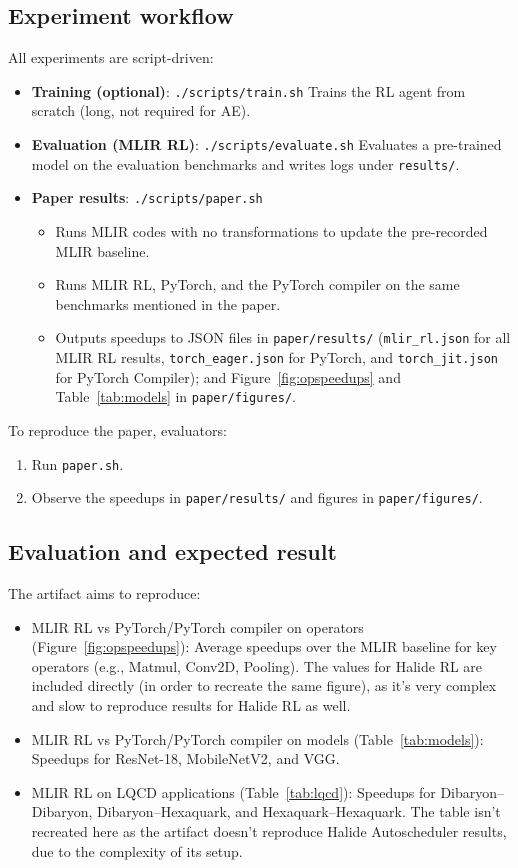 \documentclass[10pt,twocolumn]{article}
\begin{document}
\subsection{Experiment workflow}
All experiments are script-driven:
\begin{itemize}
\item \textbf{Training (optional)}: \texttt{./scripts/train.sh} Trains the RL agent from scratch (long, not required for AE).
\item \textbf{Evaluation (MLIR RL)}: \texttt{./scripts/evaluate.sh} Evaluates a pre-trained model on the evaluation benchmarks and writes logs under \texttt{results/}.
\item \textbf{Paper results}: \texttt{./scripts/paper.sh}
\begin{itemize}
\item Runs MLIR codes with no transformations to update the pre-recorded MLIR baseline.
\item Runs MLIR RL, PyTorch, and the PyTorch compiler on the same benchmarks mentioned in the paper.
\item Outputs speedups to JSON files in \texttt{paper/results/} (\texttt{mlir\_rl.json} for all MLIR RL results, \texttt{torch\_eager.json} for PyTorch, and \texttt{torch\_jit.json} for PyTorch Compiler); and Figure~\ref{fig:opspeedups} and Table~\ref{tab:models} in \texttt{paper/figures/}.
\end{itemize}
\end{itemize}

To reproduce the paper, evaluators:
\begin{enumerate}
\item Run \texttt{paper.sh}.
\item Observe the speedups in \texttt{paper/results/} and figures in \texttt{paper/figures/}.
\end{enumerate}

\subsection{Evaluation and expected result}
The artifact aims to reproduce:
\begin{itemize}
\item MLIR RL vs PyTorch/PyTorch compiler on operators (Figure~\ref{fig:opspeedups}): Average speedups over the MLIR baseline for key operators (e.g., Matmul, Conv2D, Pooling). The values for Halide RL are included directly (in order to recreate the same figure), as it's very complex and slow to reproduce results for Halide RL as well.
\item MLIR RL vs PyTorch/PyTorch compiler on models (Table~\ref{tab:models}): Speedups for ResNet-18, MobileNetV2, and VGG.
\item MLIR RL on LQCD applications (Table~\ref{tab:lqcd}): Speedups for Dibaryon--Dibaryon, Dibaryon--Hexaquark, and Hexaquark--Hexaquark. The table isn't recreated here as the artifact doesn't reproduce Halide Autoscheduler results, due to the complexity of its setup.
\end{itemize}
\end{document}
